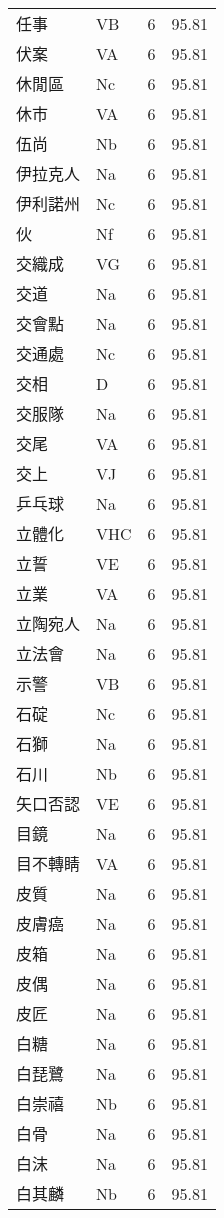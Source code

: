\documentclass[twocolumn]{book}
\begin{document}
\begin{supertabular}{llrr}
任事 & VB & 6 &  95.81\\
伏案 & VA & 6 &  95.81\\
休閒區 & Nc & 6 &  95.81\\
休市 & VA & 6 &  95.81\\
伍尚 & Nb & 6 &  95.81\\
伊拉克人 & Na & 6 &  95.81\\
伊利諾州 & Nc & 6 &  95.81\\
伙 & Nf & 6 &  95.81\\
交織成 & VG & 6 &  95.81\\
交道 & Na & 6 &  95.81\\
交會點 & Na & 6 &  95.81\\
交通處 & Nc & 6 &  95.81\\
交相 & D & 6 &  95.81\\
交服隊 & Na & 6 &  95.81\\
交尾 & VA & 6 &  95.81\\
交上 & VJ & 6 &  95.81\\
乒乓球 & Na & 6 &  95.81\\
立體化 & VHC & 6 &  95.81\\
立誓 & VE & 6 &  95.81\\
立業 & VA & 6 &  95.81\\
立陶宛人 & Na & 6 &  95.81\\
立法會 & Na & 6 &  95.81\\
示警 & VB & 6 &  95.81\\
石碇 & Nc & 6 &  95.81\\
石獅 & Na & 6 &  95.81\\
石川 & Nb & 6 &  95.81\\
矢口否認 & VE & 6 &  95.81\\
目鏡 & Na & 6 &  95.81\\
目不轉睛 & VA & 6 &  95.81\\
皮質 & Na & 6 &  95.81\\
皮膚癌 & Na & 6 &  95.81\\
皮箱 & Na & 6 &  95.81\\
皮偶 & Na & 6 &  95.81\\
皮匠 & Na & 6 &  95.81\\
白糖 & Na & 6 &  95.81\\
白琵鷺 & Na & 6 &  95.81\\
白崇禧 & Nb & 6 &  95.81\\
白骨 & Na & 6 &  95.81\\
白沫 & Na & 6 &  95.81\\
白其麟 & Nb & 6 &  95.81\\

\end{supertabular}
\end{document}
